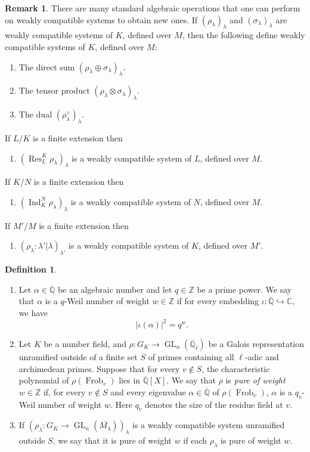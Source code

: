 \documentclass{amsart}
\theoremstyle{definition}
\newtheorem{definition}[theorem]{Definition}
\newtheorem{remark}[theorem]{Remark}
\numberwithin{equation}{section} %
\newcommand{\GL}{\operatorname{GL}}
\newcommand{\Qlbar}{\ensuremath{\overline{\mathbb{Q}_\ell}}}
\newcommand{\Frob}{\operatorname{Frob}}
\newcommand{\Ind}{\operatorname{Ind}}
\newcommand{\Res}{\operatorname{Res}}
\newcommand{\bb}[1]{\mathbb{#1}}
\newcommand{\ol}[1]{\overline{#1}}
\begin{document}
\begin{remark} \label{rmk: operations on compatible systems}
There are many standard algebraic operations that one can perform on weakly compatible systems to obtain new ones.
If $(\rho_\lambda)_\lambda$ and $(\sigma_\lambda)_\lambda$ are weakly compatible systems of $K$, defined over $M$, then the following define weakly compatible systems of $K$, defined over $M$:
\begin{enumerate}
    \item The direct sum $(\rho_\lambda \oplus \sigma_\lambda)_\lambda$.
    \item The tensor product $(\rho_\lambda \otimes \sigma_\lambda)_\lambda$.
    \item The dual $(\rho_\lambda^\vee)_\lambda$.
\end{enumerate}
If $L/K$ is a finite extension then
\begin{enumerate}[resume]
    \item $(\Res_{L}^K \rho_\lambda)_\lambda$ is a weakly compatible system of $L$, defined over $M$.
\end{enumerate}
If $K/N$ is a finite extension then
\begin{enumerate}[resume]
    \item $(\Ind_{K}^N \rho_\lambda)_\lambda$ is a weakly compatible system of $N$, defined over $M$.
\end{enumerate}
If $M'/M$ is a finite extension then
\begin{enumerate}[resume]
    \item $(\rho_{\lambda}: \lambda'|\lambda)_{\lambda'}$ is a weakly compatible system of $K$, defined over $M'$.
\end{enumerate}
\end{remark}

\begin{definition}
\begin{enumerate}
    \item Let $\alpha \in \ol{\bb{Q}}$ be an algebraic number and let $q \in \bb{Z}$ be a prime power. 
We say that $\alpha$ is a $q$-Weil number of weight $w \in \bb{Z}$ if for every embedding $\iota: \overline{\bb{Q}} \hookrightarrow \bb{C}$, we have
\[
|\iota(\alpha)|^2 = q^w.
\]
\item Let $K$ be a number field, and $\rho: G_K \to \GL_n(\Qlbar)$ be a Galois representation unramified outside of a finite set $S$ of primes containing all $\ell$-adic and archimedean primes.
Suppose that for every $v \not\in S$, the characteristic polynomial of $\rho(\Frob_v)$ lies in $\overline{\bb{Q}}[X]$.
We say that $\rho$ is \textit{pure of weight} $w \in \bb{Z}$ if, for every $v \not\in S$ and every eigenvalue $\alpha \in \ol{\bb{Q}}$ of $\rho(\Frob_v)$, $\alpha$ is a $q_v$-Weil number of weight $w$.
Here $q_v$ denotes the size of the residue field at $v$.
\item If $(\rho_\lambda: G_K \to \GL_n(\ol{M_\lambda}))_\lambda$ is a weakly compatible system unramified outside $S$, we say that it is pure of weight $w$ if each $\rho_\lambda$ is pure of weight $w$.
\end{enumerate}
\end{definition}
\end{document}
